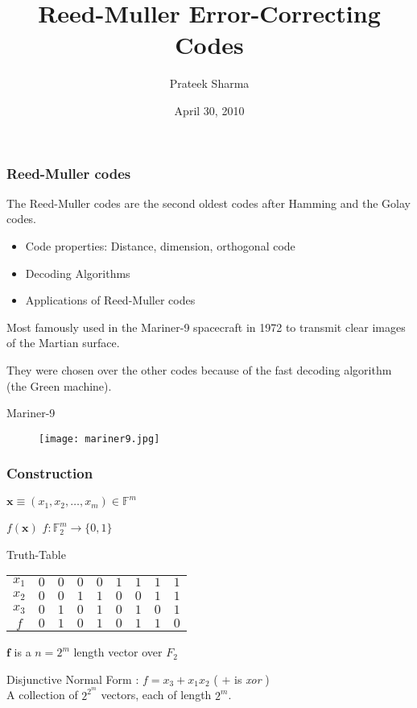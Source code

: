 \message{ !name(1.tex)}\documentclass[xcolor=xvgnames]{beamer}
\title{Reed-Muller Error-Correcting Codes}
\author{Prateek Sharma}
\date{April 30, 2010}
\newcommand{\rem}{Reed-Muller}
\newcommand{\F}{\ensuremath{\mathbb{F}}}
\newcommand{\V}[1]{\ensuremath{\mathbf{#1}}}
\begin{document}

\maketitle



\begin{frame}
 \frametitle{Reed-Muller codes}
The Reed-Muller codes are the second oldest codes after Hamming and the Golay codes.

\begin{itemize}
In this talk:
\item Code properties: Distance, dimension, orthogonal code
\item Decoding Algorithms
\item Applications of \rem{} codes
\end{itemize}

Most famously used in the Mariner-9 spacecraft in 1972 to transmit clear images of the Martian surface.

They were chosen over the other codes because of the fast decoding algorithm (the Green machine).

\end{frame}

\begin{frame}{Mariner-9}
\begin{figure}
   \texttt{[image: mariner9.jpg]}
\end{figure}
\end{frame}



\begin{frame}
\frametitle{Construction}
$\V{x} \equiv (x_1,x_2,\ldots,x_m) \in \F^m$ 

$f(\V{x})$  \quad $f: \F_{2}^{m} \rightarrow \{0,1\} $ 
\newline

\begin {center}{Truth-Table}
\begin{tabular}{|c|c|c|c|c|c|c|c|c|}
\hline
$x_1$ & $0$ & $0$ & $0$ & $0$ & $1$ & $1$ & $1$ & $1$ \\
$x_2$ & $0$ & $0$ & $1$ & $1$ & $0$ & $0$ & $1$ & $1$ \\
$x_3$ & $0$ & $1$ & $0$ & $1$ & $0$ & $1$ & $0$ & $1$ \\
\hline
$f$   & $0$ & $1$ & $0$ & $1$ & $0$ & $1$ & $1$ & $0$ \\
\hline
\end{tabular}
\end{center} 
$\V{f}$ is a $n=2^m$ length vector over $F_2$

Disjunctive Normal Form : $f = x_3 + x_1x_2$  ( $+$ is \emph{xor} ) \\

A collection of $2^{2^m}$ vectors, each of length $2^m$.
\end{frame}
\end{document}
